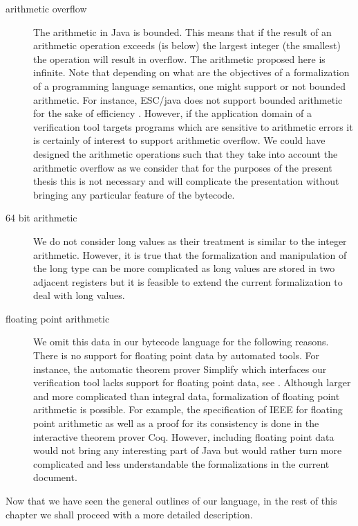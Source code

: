 \begin{description}
   \item [arithmetic overflow] The arithmetic in Java is  bounded. This means that if the result of an 
         arithmetic operation exceeds (is below) the largest integer (the smallest)  the operation will
	 result in overflow. The arithmetic proposed here is infinite. 
	 Note that depending on what are the objectives of a formalization of a programming language semantics,
	 one might support or not bounded arithmetic.
	 For instance,  ESC/java does not support bounded arithmetic for the sake of efficiency \cite{FLL02ESC}.  
	 However, if the application domain of a verification tool targets programs which 
	 are sensitive to arithmetic errors it is certainly of interest to support arithmetic overflow.  
	 We could have designed the arithmetic operations such that they take into account the arithmetic overflow
	 as we consider that for the purposes of the present thesis this is not necessary and will 
	 complicate the presentation without bringing any particular feature of the bytecode. 
	 

   \item [64 bit arithmetic]  We do not consider  
	  long values as their treatment is similar to the integer arithmetic.
	  However, it is true that the formalization and manipulation of the long type can be more complicated as
	  long values are stored in two adjacent registers but it is feasible to extend the current formalization 
	  to deal with long values.

   \item [floating point arithmetic] We omit this data in our bytecode language for the following reasons.
	 There is no support for floating point data by automated tools.  
	 For instance, the automatic theorem prover Simplify which interfaces our verification tool
	 lacks support for floating point data, see  \cite{ESC2000LNS}. 
	 Although larger and more complicated than integral data, formalization of floating point arithmetic is possible. 
	 For example, the specification of IEEE  \cite{DRT03GLF} for floating point
	 arithmetic as well as a proof for its consistency  is done in the interactive
	 theorem prover Coq. 
	 However, including floating point data would not
	 bring any interesting part of Java but would rather turn more complicated
	 and less understandable the formalizations in the current document.
	  
         
 \end{description}

 Now that we have seen the general outlines of our language,
 in the rest of this chapter we shall proceed with a more detailed description.

